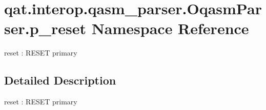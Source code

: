 \hypertarget{namespaceqat_1_1interop_1_1qasm__parser_1_1OqasmParser_1_1p__reset}{\section{qat.\-interop.\-qasm\-\_\-parser.\-Oqasm\-Parser.\-p\-\_\-reset Namespace Reference}
\label{namespaceqat_1_1interop_1_1qasm__parser_1_1OqasmParser_1_1p__reset}
}


reset \-: R\-E\-S\-E\-T primary  




\subsection{Detailed Description}
reset \-: R\-E\-S\-E\-T primary 